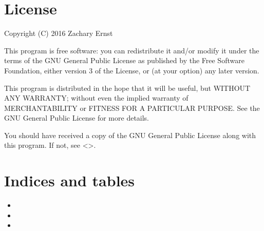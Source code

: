 \documentclass[letterpaper,10pt,english]{sphinxmanual}
\begin{document}
\chapter{License}
\label{\detokenize{license:license}}\label{\detokenize{license::doc}}
Copyright (C) 2016 Zachary Ernst

This program is free software: you can redistribute it and/or modify
it under the terms of the GNU General Public License as published by
the Free Software Foundation, either version 3 of the License, or
(at your option) any later version.

This program is distributed in the hope that it will be useful,
but WITHOUT ANY WARRANTY; without even the implied warranty of
MERCHANTABILITY or FITNESS FOR A PARTICULAR PURPOSE.  See the
GNU General Public License for more details.

You should have received a copy of the GNU General Public License
along with this program.  If not, see \textless{}\textgreater{}.


\chapter{Indices and tables}
\label{\detokenize{index:indices-and-tables}}\begin{itemize}
\item {} 

\item {} 

\item {} 

\end{itemize}
\end{document}
